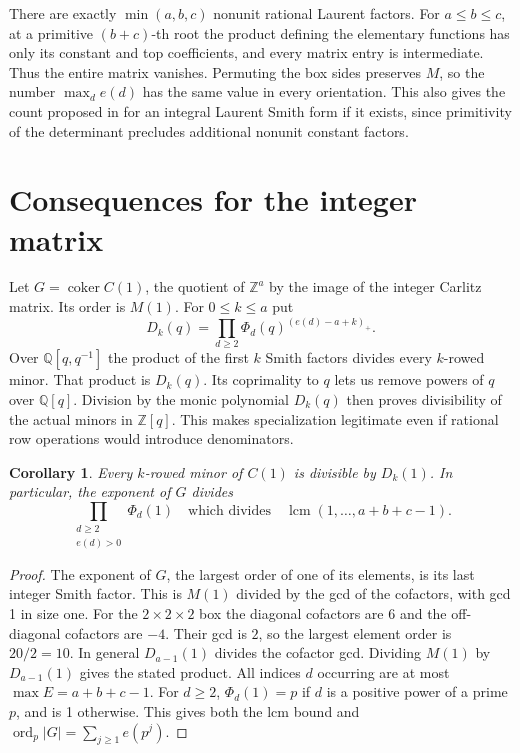 \documentclass[11pt]{article}
\newtheorem{corollary}[theorem]{Corollary}
\newcommand{\Z}{\mathbb Z}
\newcommand{\Q}{\mathbb Q}
\newcommand{\ord}{\operatorname{ord}}
\newcommand{\coker}{\operatorname{coker}}
\newcommand{\laur}{\Q[q,q^{-1}]}
\begin{document}
There are exactly \(\min(a,b,c)\) nonunit rational Laurent factors. For
\(a\le b\le c\), at a primitive \((b+c)\)-th root the product defining
the elementary functions has only its constant and top coefficients,
and every matrix entry is intermediate. Thus the entire matrix vanishes.
Permuting the box sides preserves \(M\), so the number \(\max_d e(d)\)
has the same value in every orientation. This also gives the count
proposed in \cite[\S9]{Conlon} for an integral Laurent Smith form
if it exists, since primitivity of the determinant precludes
additional nonunit constant factors.

\section{Consequences for the integer matrix}\label{sec:integer}

Let \(G=\coker C(1)\), the quotient of \(\Z^a\) by the image of the
integer Carlitz matrix. Its order is \(M(1)\). For \(0\le k\le a\) put
\[
       D_k(q)=\prod_{d\ge2}\Phi_d(q)^{(e(d)-a+k)_+}.
\]
Over \(\laur\) the product of the first \(k\) Smith factors divides every
\(k\)-rowed minor. That product is \(D_k(q)\). Its coprimality to \(q\)
lets us remove powers of \(q\) over \(\Q[q]\). Division by the monic
polynomial \(D_k(q)\) then proves divisibility of the actual minors
in \(\Z[q]\). This makes specialization legitimate
even if rational row operations would introduce denominators.

\begin{corollary}\label{cor:int}
Every \(k\)-rowed minor of \(C(1)\) is divisible by \(D_k(1)\). In
particular, the exponent of \(G\) divides
\[
      \prod_{\substack{d\ge2\\e(d)>0}}\Phi_d(1)
      \quad\text{which divides}\quad
      \operatorname{lcm}(1,\ldots,a+b+c-1).
\]
\end{corollary}
\begin{proof}
The exponent of \(G\), the largest order of one of its elements, is
its last integer Smith factor. This is \(M(1)\) divided by the gcd of
the cofactors, with gcd 1 in size one. For the \(2\times2\times2\) box
the diagonal cofactors are \(6\) and the off-diagonal cofactors are
\(-4\). Their gcd is \(2\), so the
largest element order is \(20/2=10\). In general \(D_{a-1}(1)\)
divides the cofactor gcd. Dividing \(M(1)\) by \(D_{a-1}(1)\) gives
the stated product. All indices \(d\) occurring are at most
\(\max E=a+b+c-1\). For \(d\ge2\), \(\Phi_d(1)=p\) if \(d\) is
a positive power of a prime \(p\), and is 1 otherwise. This gives both
the lcm bound and \(\ord_p |G|=\sum_{j\ge1}e(p^j)\).
\end{proof}
\end{document}
